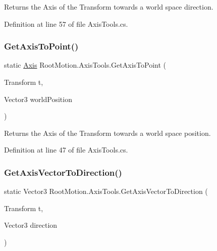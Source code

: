 Returns the Axis of the Transform towards a world space direction. 



Definition at line 57 of file Axis\+Tools.\+cs.

\mbox{\label{class_root_motion_1_1_axis_tools_a0c0bf43571bb035f94c65ee01d0f51ad}} 
\subsubsection{\texorpdfstring{Get\+Axis\+To\+Point()}{GetAxisToPoint()}}
{\footnotesize\ttfamily static \mbox{\hyperlink{namespace_root_motion_a824e68ffa644559736d5e0bc80919a87}{Axis}} Root\+Motion.\+Axis\+Tools.\+Get\+Axis\+To\+Point (\begin{DoxyParamCaption}\item[{Transform}]{t,  }\item[{Vector3}]{world\+Position }\end{DoxyParamCaption})\hspace{0.3cm}{\ttfamily [static]}}



Returns the Axis of the Transform towards a world space position. 



Definition at line 47 of file Axis\+Tools.\+cs.

\mbox{\label{class_root_motion_1_1_axis_tools_adf6c7598897f860d50a61d176bd03a7d}} 
\subsubsection{\texorpdfstring{Get\+Axis\+Vector\+To\+Direction()}{GetAxisVectorToDirection()}}
{\footnotesize\ttfamily static Vector3 Root\+Motion.\+Axis\+Tools.\+Get\+Axis\+Vector\+To\+Direction (\begin{DoxyParamCaption}\item[{Transform}]{t,  }\item[{Vector3}]{direction }\end{DoxyParamCaption})\hspace{0.3cm}{\ttfamily [static]}}



